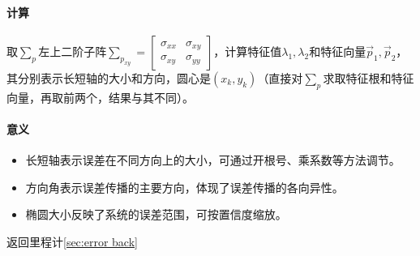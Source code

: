 \documentclass[
12pt, %
a4paper, 
oneside, %
headinclude,footinclude, %
]{scrartcl}
\begin{document}
\paragraph{计算}
取$ \sum_p $左上二阶子阵$ \sum_{p_{xy}} = \begin{bmatrix} \sigma_{xx} & \sigma_{xy} \\ \sigma_{xy} & \sigma_{yy} \end{bmatrix} $，计算特征值$ \lambda_1,\lambda_2 $和特征向量$ \overrightarrow{p}_1,\overrightarrow{p}_2 $，其分别表示长短轴的大小和方向，圆心是$ (x_k, y_k) $（直接对$ \sum_p $求取特征根和特征向量，再取前两个，结果与其不同）。
\paragraph{意义}
\begin{itemize}
\item 长短轴表示误差在不同方向上的大小，可通过开根号、乘系数等方法调节。
\item 方向角表示误差传播的主要方向，体现了误差传播的各向异性。
\item 椭圆大小反映了系统的误差范围，可按置信度缩放。
\end{itemize}

返回里程计\ref{sec:error back}
\end{document}
